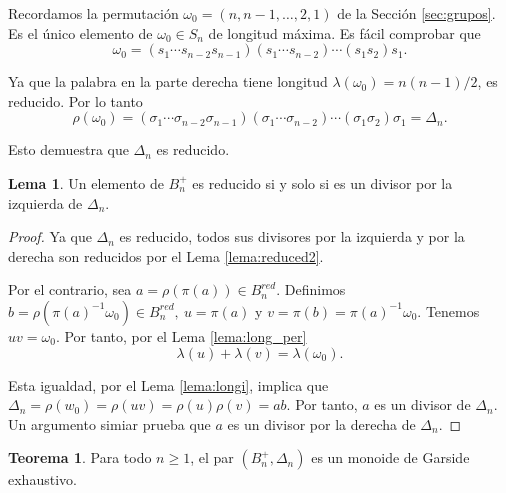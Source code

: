 \documentclass[12pt]{book}
\theoremstyle{definition}
\newtheorem{teor}{Teorema}[section]
\newtheorem{lema}{Lema}[section]
\begin{document}
Recordamos la permutación $\omega_0=(n,n-1,\ldots,2,1)$ de la Sección \ref{sec:grupos}. Es el único elemento de $\omega_0\in S_n$ de longitud máxima. Es fácil comprobar que
$$\omega_0=(s_1\cdots s_{n-2}s_{n-1})(s_1\cdots s_{n-2})\cdots(s_1s_2)s_1.$$

Ya que la palabra en la parte derecha tiene longitud $\lambda(\omega_0)=n(n-1)/2$, es reducido. Por lo tanto
$$\rho(\omega_0)=(\sigma_1\cdots \sigma_{n-2}\sigma_{n-1})(\sigma_1\cdots \sigma_{n-2})\cdots(\sigma_1\sigma_2)\sigma_1=\Delta_n.$$

Esto demuestra que $\Delta_n$ es reducido.

\begin{lema}
Un elemento de $B_n^+$ es reducido si y solo si es un divisor por la izquierda de $\Delta_n$.
\label{lema:reduced3}
\end{lema}

\begin{proof} Ya que $\Delta_n$ es reducido, todos sus divisores por la izquierda y por la derecha son reducidos por el Lema \ref{lema:reduced2}.

Por el contrario, sea $a=\rho(\pi(a))\in B_n^{red}$. Definimos $b=\rho(\pi(a)^{-1}\omega_0)\in B_n^{red},\ u=\pi(a)$ y $v=\pi(b)=\pi(a)^{-1}\omega_0$. Tenemos $uv=\omega_0$. Por tanto, por el Lema \ref{lema:long_per} 
$$\lambda(u)+\lambda(v)=\lambda(\omega_0).$$

Esta igualdad, por el Lema \ref{lema:longi}, implica que $\Delta_n=\rho(w_0)=\rho(uv)=\rho(u)\rho(v)=ab$. Por tanto, $a$ es un divisor de $\Delta_n$. Un argumento simiar prueba que $a$ es un divisor por la derecha de $\Delta_n$.
\end{proof}

\begin{teor}
Para todo $n\geq 1$, el par $(B_n^+,\Delta_n)$ es un monoide de Garside exhaustivo.
\label{teor:trenzas-garside}
\end{teor}
\end{document}
